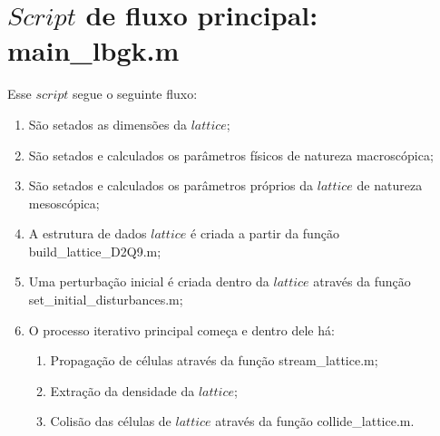 \section{$Script$ de fluxo principal: main\_lbgk.m}
Esse $script$ segue o seguinte fluxo:
\begin{enumerate}
	\item São setados as dimensões da $lattice$;
	\item São setados e calculados os parâmetros físicos de natureza macroscópica;
	\item São setados e calculados os parâmetros próprios da $lattice$ de natureza mesoscópica;
	\item A estrutura de dados $lattice$ é criada a partir da função build\_lattice\_D2Q9.m;
	\item Uma perturbação inicial é criada dentro da $lattice$ através da função \\ set\_initial\_disturbances.m;
	\item O processo iterativo principal começa e dentro dele há:
		\begin{enumerate}
			\item Propagação de células através da função stream\_lattice.m;
			\item Extração da densidade da $lattice$;
			\item Colisão das células de $lattice$ através da função collide\_lattice.m.
		\end{enumerate}
\end{enumerate}
